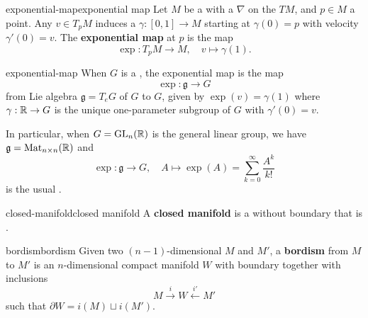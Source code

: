 \begin{topic}{exponential-map}{exponential map}
    Let $M$ be a  with a  $\nabla$ on the  $TM$, and $p \in M$ a point. Any  $v \in T_p M$ induces a  $\gamma : [0, 1] \to M$ starting at $\gamma(0) = p$ with velocity $\gamma'(0) = v$. The \textbf{exponential map} at $p$ is the map
    \[ \exp : T_p M \to M, \quad v \mapsto \gamma(1) . \]
\end{topic}

\begin{example}{exponential-map}
    When $G$ is a , the exponential map is the map
    \[ \exp : \mathfrak{g} \to G \]
    from Lie algebra $\mathfrak{g} = T_e G$ of $G$ to $G$, given by $\exp(v) = \gamma(1)$ where $\gamma : \mathbb{R} \to G$ is the unique one-parameter subgroup of $G$ with $\gamma'(0) = v$.
    
    In particular, when $G = \textup{GL}_n(\mathbb{R})$ is the general linear group, we have $\mathfrak{g} = \textup{Mat}_{n \times n}(\mathbb{R})$ and
    \[ \exp : \mathfrak{g} \to G, \quad A \mapsto \exp(A) = \sum_{k = 0}^{\infty} \frac{A^k}{k!} \]
    is the usual .
\end{example}

\begin{topic}{closed-manifold}{closed manifold}
    A \textbf{closed manifold} is a  without boundary that is .
\end{topic}

\begin{topic}{bordism}{bordism}
    Given two $(n - 1)$-dimensional   $M$ and $M'$, a \textbf{bordism} from $M$ to $M'$ is an $n$-dimensional compact manifold $W$ with boundary together with inclusions
    \[ M \xrightarrow{i} W \xleftarrow{i'} M' \]
    such that $\partial W = i(M) \sqcup i(M')$.
\end{topic}

